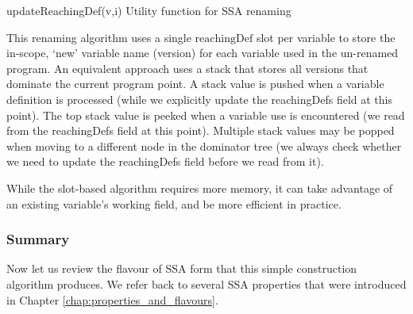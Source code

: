 \begin{procedure}
\caption{updateReachingDef(v,i) Utility
  function for SSA renaming\label{alg:classical:updateRD}}
\end{procedure}

This renaming algorithm uses a single $\mathrm{reachingDef}$ slot 
per variable to store the in-scope, `new' variable name (version) for each
variable used in the un-renamed program. An equivalent approach uses a stack that stores all versions that dominate the current program point. 
A stack value is pushed when a variable definition is
processed (while we explicitly update the reachingDefs field at this point).
The top stack value is peeked when a variable use is encountered
(we read from the reachingDefs field at this point).
Multiple stack values may be popped when moving to a different node
in the dominator tree 
(we always check whether we need to update the reachingDefs field
before we read from it).

While the slot-based algorithm requires more memory, it can take advantage of an existing variable's working field, and be more efficient in practice. 

\subsubsection*{Summary}

Now let us review the flavour of SSA form that this simple
construction algorithm produces. We refer back to several
SSA properties that were introduced in
Chapter \ref{chap:properties_and_flavours}.

